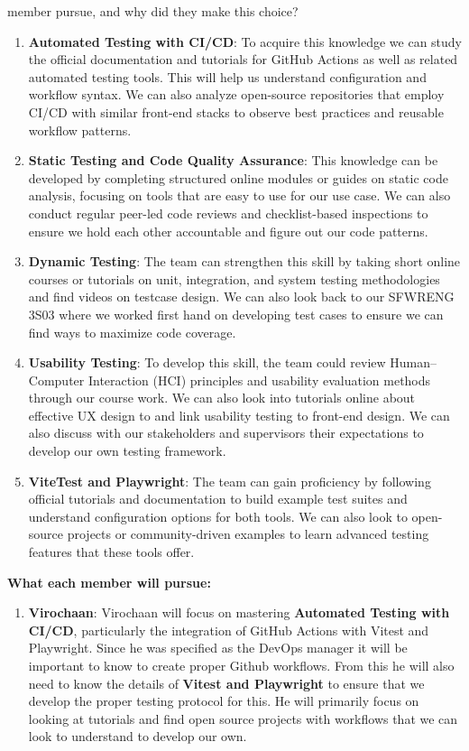 \documentclass[12pt, titlepage]{article}
\begin{document}
\begin{enumerate}
{  member pursue, and why did they make this choice?}
  \begin{enumerate}
    \item \textbf{Automated Testing with CI/CD}: 
    To acquire this knowledge we can study the official documentation and tutorials for GitHub Actions as well as related automated testing tools. This will help us understand configuration and workflow syntax. We can also analyze open-source repositories that employ CI/CD with similar front-end stacks to observe best practices and reusable workflow patterns. 
    \item \textbf{Static Testing and Code Quality Assurance}: 
    This knowledge can be developed by completing structured online modules or guides on static code analysis, focusing on tools that are easy to use for our use case. We can also conduct regular peer-led code reviews and checklist-based inspections to ensure we hold each other accountable and figure out our code patterns. 

    \item \textbf{Dynamic Testing}: 
    The team can strengthen this skill by taking short online courses or tutorials on unit, integration, and system testing methodologies and find videos on testcase design. We can also look back to our SFWRENG 3S03 where we worked first hand on developing test cases to ensure we can find ways to maximize code coverage.

    \item \textbf{Usability Testing}: 
    To develop this skill, the team could review Human–Computer Interaction (HCI) principles and usability evaluation methods through our course work. We can also look into tutorials online about effective UX design to and link usability testing to front-end design. We can also discuss with our stakeholders and supervisors their expectations to develop our own testing framework.


    \item \textbf{ViteTest and Playwright}: 
    The team can gain proficiency by following official tutorials and documentation to build example test suites and understand configuration options for both tools. We can also look to open-source projects or community-driven examples to learn advanced testing features that these tools offer. \newline
\end{enumerate}

\textbf{What each member will pursue:}
\begin{enumerate}
    \item \textbf{Virochaan}:  Virochaan will focus on mastering \textbf{Automated Testing with CI/CD}, particularly the integration of GitHub Actions with Vitest and Playwright. Since he was specified as the DevOps manager it will be important to know to create proper Github workflows. From this he will also need to know the details of \textbf{Vitest and Playwright} to ensure that we develop the proper testing protocol for this. He will primarily focus on looking at tutorials and find open source projects with workflows that we can look to understand to develop our own.


\end{enumerate}
\end{enumerate}
\end{document}

